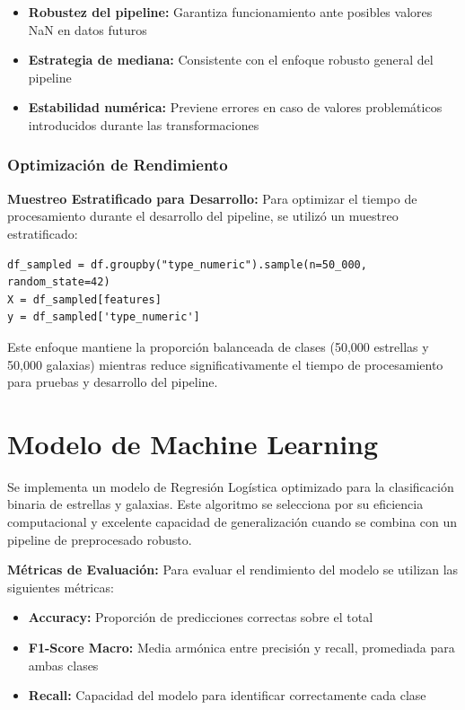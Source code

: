 \documentclass{article}
\begin{document}
\begin{itemize}
    \item \textbf{Robustez del pipeline:} Garantiza funcionamiento ante posibles valores NaN en datos futuros
    \item \textbf{Estrategia de mediana:} Consistente con el enfoque robusto general del pipeline
    \item \textbf{Estabilidad numérica:} Previene errores en caso de valores problemáticos introducidos durante las transformaciones
\end{itemize}

\subsubsection{Optimización de Rendimiento}

\textbf{Muestreo Estratificado para Desarrollo:}
Para optimizar el tiempo de procesamiento durante el desarrollo del pipeline, se utilizó un muestreo estratificado:

\begin{verbatim}
df_sampled = df.groupby("type_numeric").sample(n=50_000, random_state=42)
X = df_sampled[features]
y = df_sampled['type_numeric']
\end{verbatim}

Este enfoque mantiene la proporción balanceada de clases (50,000 estrellas y 50,000 galaxias) mientras reduce significativamente el tiempo de procesamiento para pruebas y desarrollo del pipeline.

\newpage

\section{Modelo de Machine Learning}

Se implementa un modelo de Regresión Logística optimizado para la clasificación binaria de estrellas y galaxias. Este algoritmo se selecciona por su eficiencia computacional y excelente capacidad de generalización cuando se combina con un pipeline de preprocesado robusto.

\textbf{Métricas de Evaluación:}
Para evaluar el rendimiento del modelo se utilizan las siguientes métricas:
\begin{itemize}
    \item \textbf{Accuracy:} Proporción de predicciones correctas sobre el total
    \item \textbf{F1-Score Macro:} Media armónica entre precisión y recall, promediada para ambas clases
    \item \textbf{Recall:} Capacidad del modelo para identificar correctamente cada clase
\end{itemize}
\end{document}
